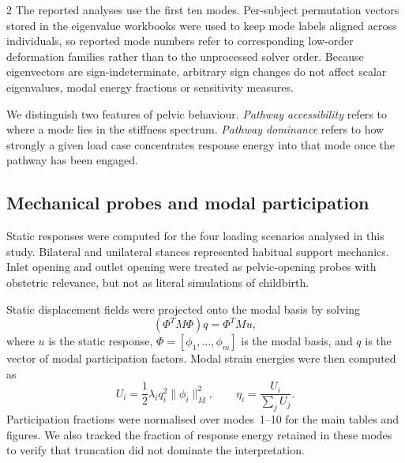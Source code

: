 \documentclass[openacc]{rsproca_new}
\begin{document}
\begin{multicols}{2}
The reported analyses use the first ten modes. Per-subject permutation vectors stored in the eigenvalue workbooks were used to keep mode labels aligned across individuals, so reported mode numbers refer to corresponding low-order deformation families rather than to the unprocessed solver order. Because eigenvectors are sign-indeterminate, arbitrary sign changes do not affect scalar eigenvalues, modal energy fractions or sensitivity measures.

We distinguish two features of pelvic behaviour. \emph{Pathway accessibility} refers to where a mode lies in the stiffness spectrum. \emph{Pathway dominance} refers to how strongly a given load case concentrates response energy into that mode once the pathway has been engaged.


\subsection{Mechanical probes and modal participation}

Static responses were computed for the four loading scenarios analysed in this study. Bilateral and unilateral stances represented habitual support mechanics. Inlet opening and outlet opening were treated as pelvic-opening probes with obstetric relevance, but not as literal simulations of childbirth.

Static displacement fields were projected onto the modal basis by solving
\begin{equation}
(\Phi^{T}M\Phi)q = \Phi^{T}Mu,
\end{equation}
where $u$ is the static response, $\Phi=[\phi_{1},\ldots,\phi_{m}]$ is the modal basis, and $q$ is the vector of modal participation factors. Modal strain energies were then computed as
\begin{equation}
U_{i}=\frac{1}{2}\lambda_{i}q_{i}^{2}\lVert\phi_{i}\rVert_{M}^{2}, \qquad
\eta_{i}=\frac{U_{i}}{\sum_{j}U_{j}}.
\end{equation}
Participation fractions were normalised over modes~1--10 for the main tables and figures. We also tracked the fraction of response energy retained in these modes to verify that truncation did not dominate the interpretation.


\end{multicols}
\end{document}
